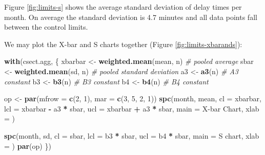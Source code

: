 \documentclass[
]{book}
\newenvironment{Shaded}{\begin{snugshade}}{\end{snugshade}}
\newcommand{\AttributeTok}[1]{\textcolor[rgb]{0.13,0.29,0.53}{#1}}
\newcommand{\CommentTok}[1]{\textcolor[rgb]{0.56,0.35,0.01}{\textit{#1}}}
\newcommand{\DecValTok}[1]{\textcolor[rgb]{0.00,0.00,0.81}{#1}}
\newcommand{\FunctionTok}[1]{\textcolor[rgb]{0.13,0.29,0.53}{\textbf{#1}}}
\newcommand{\NormalTok}[1]{#1}
\newcommand{\OtherTok}[1]{\textcolor[rgb]{0.56,0.35,0.01}{#1}}
\newcommand{\SpecialCharTok}[1]{\textcolor[rgb]{0.81,0.36,0.00}{\textbf{#1}}}
\newcommand{\StringTok}[1]{\textcolor[rgb]{0.31,0.60,0.02}{#1}}
\begin{document}
Figure \ref{fig:limits-s} shows the average standard deviation of delay times per month. On average the standard deviation is 4.7 minutes and all data points fall between the control limits.

We may plot the X-bar and S charts together (Figure \ref{fig:limits-xbarands}):

\begin{Shaded}
\begin{Highlighting}[]
\FunctionTok{with}\NormalTok{(csect.agg, \{}
\NormalTok{  xbarbar }\OtherTok{\textless{}{-}} \FunctionTok{weighted.mean}\NormalTok{(mean, n)  }\CommentTok{\# pooled average}
\NormalTok{  sbar    }\OtherTok{\textless{}{-}} \FunctionTok{weighted.mean}\NormalTok{(sd, n)    }\CommentTok{\# pooled standard deviation}
\NormalTok{  a3      }\OtherTok{\textless{}{-}} \FunctionTok{a3}\NormalTok{(n)                   }\CommentTok{\# A3 constant}
\NormalTok{  b3      }\OtherTok{\textless{}{-}} \FunctionTok{b3}\NormalTok{(n)                   }\CommentTok{\# B3 constant}
\NormalTok{  b4      }\OtherTok{\textless{}{-}} \FunctionTok{b4}\NormalTok{(n)                   }\CommentTok{\# B4 constant}
  
\NormalTok{  op }\OtherTok{\textless{}{-}} \FunctionTok{par}\NormalTok{(}\AttributeTok{mfrow =} \FunctionTok{c}\NormalTok{(}\DecValTok{2}\NormalTok{, }\DecValTok{1}\NormalTok{),}
            \AttributeTok{mar   =} \FunctionTok{c}\NormalTok{(}\DecValTok{3}\NormalTok{, }\DecValTok{5}\NormalTok{, }\DecValTok{2}\NormalTok{, }\DecValTok{1}\NormalTok{))}
  \FunctionTok{spc}\NormalTok{(month, mean,}
      \AttributeTok{cl   =}\NormalTok{ xbarbar,}
      \AttributeTok{lcl  =}\NormalTok{ xbarbar }\SpecialCharTok{{-}}\NormalTok{ a3 }\SpecialCharTok{*}\NormalTok{ sbar,}
      \AttributeTok{ucl  =}\NormalTok{ xbarbar }\SpecialCharTok{+}\NormalTok{ a3 }\SpecialCharTok{*}\NormalTok{ sbar,}
      \AttributeTok{main =} \StringTok{\textquotesingle{}X{-}bar Chart\textquotesingle{}}\NormalTok{,}
      \AttributeTok{xlab =} \StringTok{\textquotesingle{}\textquotesingle{}}\NormalTok{)}
  
  \FunctionTok{spc}\NormalTok{(month, sd,}
      \AttributeTok{cl   =}\NormalTok{ sbar,}
      \AttributeTok{lcl  =}\NormalTok{ b3 }\SpecialCharTok{*}\NormalTok{ sbar,}
      \AttributeTok{ucl  =}\NormalTok{ b4 }\SpecialCharTok{*}\NormalTok{ sbar,}
      \AttributeTok{main =} \StringTok{\textquotesingle{}S chart\textquotesingle{}}\NormalTok{,}
      \AttributeTok{xlab =} \StringTok{\textquotesingle{}\textquotesingle{}}\NormalTok{)}
  \FunctionTok{par}\NormalTok{(op)}
\NormalTok{\})}
\end{Highlighting}
\end{Shaded}
\end{document}
